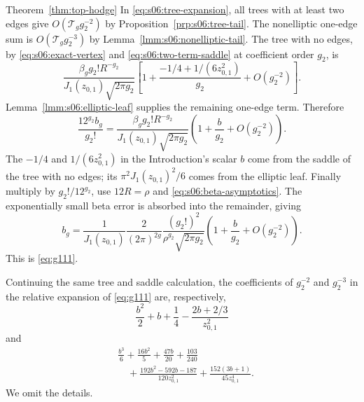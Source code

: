 \begin{prfn}{Theorem~\ref{thm:top-hodge}}
In \eqref{eq:s06:tree-expansion}, all trees with at least two edges
give $O(\mathcal T_g g_2^{-2})$ by
Proposition~\ref{prp:s06:tree-tail}. The nonelliptic one-edge sum
is $O(\mathcal T_g g_2^{-3})$ by
Lemma~\ref{lmm:s06:nonelliptic-tail}. The tree with no edges, by
\eqref{eq:s06:exact-vertex} and
\eqref{eq:s06:two-term-saddle} at coefficient order $g_2$, is
\[
 \frac{\beta_g g_2!R^{-g_2}}
      {J_1(z_{0,1})\sqrt{2\pi g_2}}
 \left[1+\frac{-1/4+1/(6z_{0,1}^2)}{g_2}
                 +O(g_2^{-2})\right].
\]
Lemma~\ref{lmm:s06:elliptic-leaf} supplies the remaining one-edge
term. Therefore
\begin{equation}\label{eq:s06:combined-expansion}
 \frac{12^{g_2}b_g}{g_2!}
 =\frac{\beta_g g_2!R^{-g_2}}
      {J_1(z_{0,1})\sqrt{2\pi g_2}}
       \left(1+\frac b{g_2}+O(g_2^{-2})\right).
\end{equation}
The $-1/4$ and $1/(6z_{0,1}^2)$ in the Introduction's scalar $b$
come from the saddle of the tree with no edges; its
$\pi^2J_1(z_{0,1})^2/6$ comes from the elliptic leaf.
Finally multiply by $g_2!/12^{g_2}$, use $12R=\rho$ and
\eqref{eq:s06:beta-asymptotics}. The exponentially small beta
error is absorbed into the remainder, giving
\[
 b_g=\frac1{J_1(z_{0,1})}\frac2{(2\pi)^{2g}}
 \frac{(g_2!)^2}{\rho^{g_2}\sqrt{2\pi g_2}}
       \left(1+\frac b{g_2}+O(g_2^{-2})\right).
\]
This is \eqref{eq:g111}.
\end{prfn}

\begin{samepage}
\begin{rmk}\label{rmk:s06:further-coefficients}
Continuing the same tree and saddle calculation, the coefficients
of $g_2^{-2}$ and $g_2^{-3}$ in the relative expansion of
\eqref{eq:g111} are, respectively,
\[
 \frac{b^2}{2}+b+\frac14-\frac{2b+2/3}{z_{0,1}^2}
\]
and
\[
 \begin{aligned}
 &\frac{b^3}{6}+\frac{16b^2}{5}+\frac{47b}{20}+\frac{103}{240}\\
 &\quad+\frac{192b^2-592b-187}{120z_{0,1}^2}
       +\frac{152(3b+1)}{45z_{0,1}^4}.
 \end{aligned}
\]
We omit the details.
\end{rmk}
\end{samepage}
